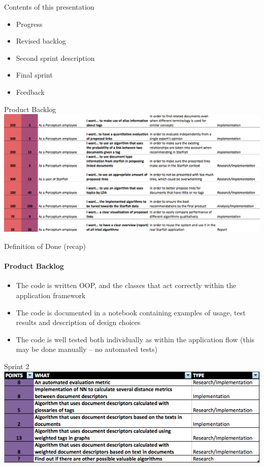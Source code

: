 
\begin{frame}[t,plain]
\titlepage
\end{frame}

\begin{frame}[t]{Contents of this presentation}
\begin{itemize}
	\item Progress
	\item Revised backlog
	\item Second sprint description 
	\item Final sprint 
	\item Feedback
\end{itemize}
\end{frame}



\begin{frame}[t]{Product Backlog}
  \includegraphics[width=\linewidth]{backlog2}
\end{frame}

\begin{frame}[t]{Definition of Done (recap)}
\framesubtitle{Product Backlog}

\begin{itemize}
	\item  The code is written OOP, and the classes that act correctly within the application framework
	\item The code is documented in a notebook containing examples of usage, test results and description of design choices 
	\item The code is well tested both individually as within the application flow (this may be done manually – no automated tests)
\end{itemize}
\end{frame}

\begin{frame}[t]{Sprint 2}
\includegraphics[width=\linewidth]{sprintt}
\end{frame}

